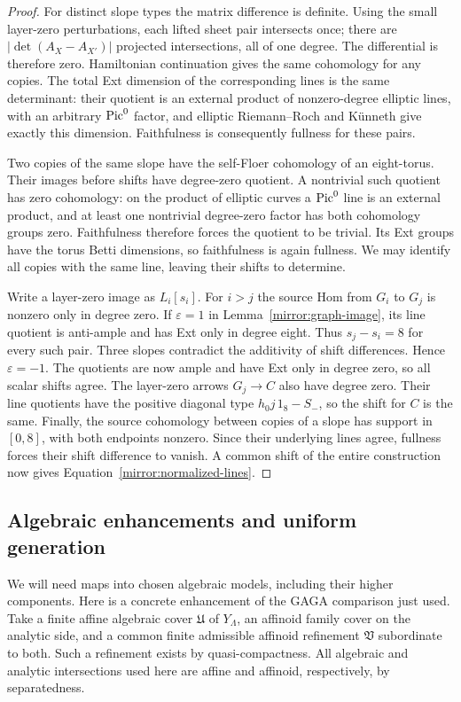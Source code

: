 \begin{proof}
For distinct slope types the matrix difference is definite.  Using
the small layer-zero perturbations, each lifted sheet pair intersects
once; there are $|\det(A_X-A_{X'})|$ projected intersections, all of
one degree.  The differential is therefore zero.  Hamiltonian
continuation gives the same cohomology for any copies.  The total
Ext dimension of the corresponding lines is the same determinant:
their quotient is an external product of nonzero-degree elliptic
lines, with an arbitrary $\operatorname{Pic}^0$ factor, and elliptic
Riemann--Roch and K\"unneth give exactly this dimension.  Faithfulness
is consequently fullness for these pairs.

Two copies of the same slope have the self-Floer cohomology of an
eight-torus.  Their images before shifts have degree-zero quotient.
A nontrivial such quotient has zero cohomology: on the product of
elliptic curves a $\operatorname{Pic}^0$ line is an external product, and at least
one nontrivial degree-zero factor has both cohomology groups zero.
Faithfulness therefore forces the quotient to be trivial.  Its Ext
groups have the torus Betti dimensions, so faithfulness is again
fullness.  We may identify all copies with the same line, leaving
their shifts to determine.

Write a layer-zero image as $L_i[s_i]$.  For $i>j$ the source Hom
from $G_i$ to $G_j$ is nonzero only in degree zero.  If
$\varepsilon=1$ in Lemma~\ref{mirror:graph-image}, its line quotient
is anti-ample and has Ext only in degree eight.  Thus
$s_j-s_i=8$ for every such pair.  Three slopes contradict the
additivity of shift differences.  Hence $\varepsilon=-1$.
The quotients are now ample and have Ext only in degree zero, so
all scalar shifts agree.  The layer-zero arrows $G_j\to C$ also
have degree zero.  Their line quotients have the positive diagonal
type $h_0j\,1_8-S_-$, so the shift for $C$ is the same.
Finally, the source cohomology between copies of a slope has support
in $[0,8]$, with both endpoints nonzero.  Since their underlying
lines agree, fullness forces their shift difference to vanish.
A common shift of the entire construction now gives
Equation~\eqref{mirror:normalized-lines}.
\end{proof}

\subsection{Algebraic enhancements and uniform generation}

We will need maps into chosen algebraic models, including their
higher components.  Here is a concrete enhancement of the GAGA
comparison just used.  Take a finite affine algebraic cover
$\mathfrak U$ of $Y_\Lambda$, an affinoid family cover on the analytic
side, and a common finite admissible affinoid refinement
$\mathfrak V$ subordinate to both.  Such a refinement exists by
quasi-compactness.  All algebraic and analytic intersections used
here are affine and affinoid, respectively, by separatedness.

